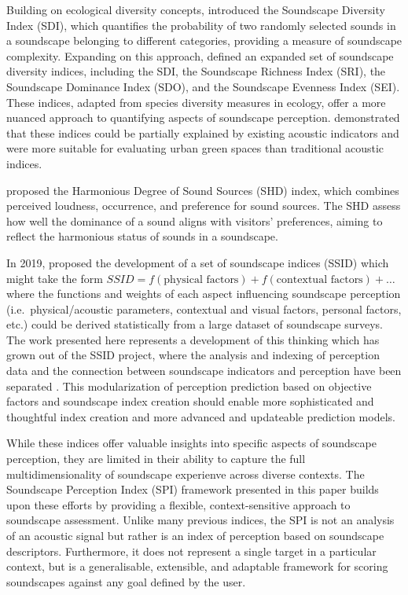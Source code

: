 \documentclass[
  authoryear,
  preprint,
  1p]{elsarticle}
\begin{document}
Building on ecological diversity concepts, \citet{Liu2014Effects}
introduced the Soundscape Diversity Index (SDI), which quantifies the
probability of two randomly selected sounds in a soundscape belonging to
different categories, providing a measure of soundscape complexity.
Expanding on this approach, \citet{Xiang2023Soundscape} defined an
expanded set of soundscape diversity indices, including the SDI, the
Soundscape Richness Index (SRI), the Soundscape Dominance Index (SDO),
and the Soundscape Evenness Index (SEI). These indices, adapted from
species diversity measures in ecology, offer a more nuanced approach to
quantifying aspects of soundscape perception.
\citet{Xiang2023Soundscape} demonstrated that these indices could be
partially explained by existing acoustic indicators and were more
suitable for evaluating urban green spaces than traditional acoustic
indices.

\citet{Guo2023Harmonious} proposed the Harmonious Degree of Sound
Sources (SHD) index, which combines perceived loudness, occurrence, and
preference for sound sources. The SHD assess how well the dominance of a
sound aligns with visitors' preferences, aiming to reflect the
harmonious status of sounds in a soundscape.

In 2019, \citet{Kang2019Towards} proposed the development of a set of
soundscape indices (SSID) which might take the form
\(SSID = f(\text{physical factors}) + f(\text{contextual factors}) + \ldots\)
where the functions and weights of each aspect influencing soundscape
perception (i.e.~physical/acoustic parameters, contextual and visual
factors, personal factors, etc.) could be derived statistically from a
large dataset of soundscape surveys. The work presented here represents
a development of this thinking which has grown out of the SSID project,
where the analysis and indexing of perception data and the connection
between soundscape indicators and perception have been separated
\citep{Mitchell2023conceptual}. This modularization of perception
prediction based on objective factors and soundscape index creation
should enable more sophisticated and thoughtful index creation and more
advanced and updateable prediction models.

While these indices offer valuable insights into specific aspects of
soundscape perception, they are limited in their ability to capture the
full multidimensionality of soundscape experienve across diverse
contexts. The Soundscape Perception Index (SPI) framework presented in
this paper builds upon these efforts by providing a flexible,
context-sensitive approach to soundscape assessment. Unlike many
previous indices, the SPI is not an analysis of an acoustic signal but
rather is an index of perception based on soundscape descriptors.
Furthermore, it does not represent a single target in a particular
context, but is a generalisable, extensible, and adaptable framework for
scoring soundscapes against any goal defined by the user.
\end{document}

